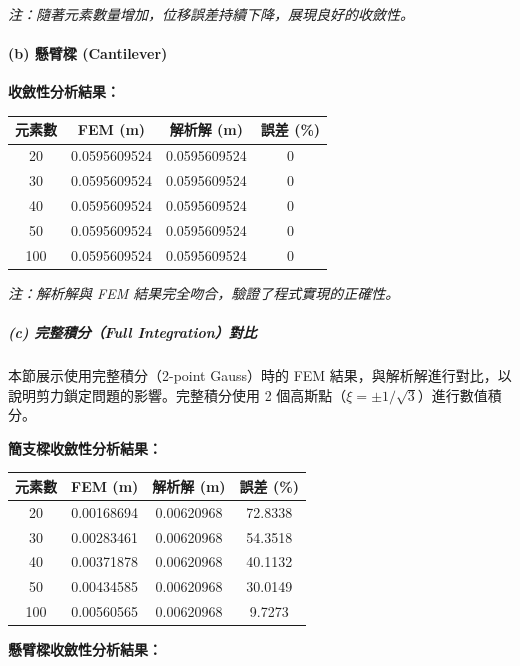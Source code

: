 \documentclass[UTF8, a4paper, 12pt]{ctexart}
\begin{document}
\textit{注：隨著元素數量增加，位移誤差持續下降，展現良好的收斂性。}

\paragraph{(b) 懸臂樑 (Cantilever)}

\textbf{收斂性分析結果：}

\begin{center}
\begin{tabular}{cccc}
\toprule
\textbf{元素數} & \textbf{FEM (m)} & \textbf{解析解 (m)} & \textbf{誤差 (\%)} \\
\midrule
20 & 0.0595609524 & 0.0595609524 & $0$ \\
30 & 0.0595609524 & 0.0595609524 & $0$ \\
40 & 0.0595609524 & 0.0595609524 & $0$ \\
50 & 0.0595609524 & 0.0595609524 & $0$ \\
100 & 0.0595609524 & 0.0595609524 & $0$ \\
\bottomrule
\end{tabular}
\end{center}

\textit{注：解析解與 FEM 結果完全吻合，驗證了程式實現的正確性。}

\subparagraph{(c) 完整積分（Full Integration）對比}

本節展示使用完整積分（2-point Gauss）時的 FEM 結果，與解析解進行對比，以說明剪力鎖定問題的影響。完整積分使用 2 個高斯點（$\xi = \pm 1/\sqrt{3}$）進行數值積分。

\textbf{簡支樑收斂性分析結果：}

\begin{center}
\begin{tabular}{cccc}
\toprule
\textbf{元素數} & \textbf{FEM (m)} & \textbf{解析解 (m)} & \textbf{誤差 (\%)} \\
\midrule
20 & 0.00168694 & 0.00620968 & 72.8338 \\
30 & 0.00283461 & 0.00620968 & 54.3518 \\
40 & 0.00371878 & 0.00620968 & 40.1132 \\
50 & 0.00434585 & 0.00620968 & 30.0149 \\
100 & 0.00560565 & 0.00620968 & 9.7273 \\
\bottomrule
\end{tabular}
\end{center}

\textbf{懸臂樑收斂性分析結果：}
\end{document}
